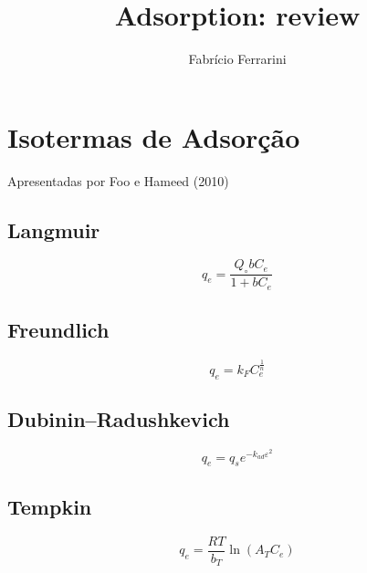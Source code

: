 \documentclass[3p]{elsarticle}
\begin{document}
\begin{frontmatter} 
\title{Adsorption: review}
\author{Fabr\'icio Ferrarini}
 


\address{Departamento de Engenharia Qu\'imica, Escola de 
Engenharia, Universidade Federal do Rio Grande do Sul,
Rua Engenheiro Luis Englert, s/n, Bairro Farroupilha, CEP 90040-040, Porto
Alegre, RS, Brazil\\July 2013}


\end{frontmatter}

\section{Isotermas de Adsorção}

Apresentadas por Foo e Hameed (2010)\cite{Foo2010}

\subsection{Langmuir}
\begin{equation}
q_e = \frac{Q_{\circ}bC_e}{1+bC_e}
\end{equation}
\cite{Langmuir1916}

\subsection{Freundlich}
\begin{equation}
q_e = k_FC_e^{\frac{1}{n}}
\end{equation}
\cite{Freundlich1906}

\subsection{Dubinin–Radushkevich}
\begin{equation}
q_e = q_se^{-k_{ad}\varepsilon^2}
\end{equation}
\cite{Dubinin1947}

\subsection{Tempkin}
\begin{equation}
q_e = \frac{RT}{b_T}\ln\left(A_TC_e\right)
\end{equation}
\cite{Tempkin1940}
\end{document}
